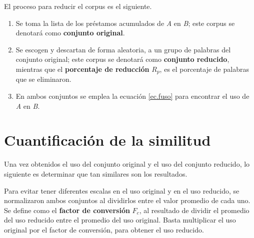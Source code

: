 El proceso para reducir el corpus es el siguiente. 

\begin{enumerate}
	
	\item Se toma la lista de los préstamos acumulados de \textit{A} en \textit{B}; este corpus se denotará como \textbf{conjunto original}.
	
	\item Se escogen y descartan de forma aleatoria, a un grupo de palabras del conjunto original; este corpus  se denotará como \textbf{conjunto reducido}, mientras que el \textbf{porcentaje de reducción} $R_{p}$, es el porcentaje de palabras que se eliminaron.
	
	
	
	\item En ambos conjuntos se emplea la ecuación \ref{ec.fuso} para encontrar el uso de \textit{A} en \textit{B}. %
	
\end{enumerate}

\section{Cuantificación de la similitud}

Una vez obtenidos el uso del conjunto original y el uso del conjunto reducido, lo siguiente es determinar que tan similares son los resultados.

Para evitar tener diferentes escalas en el uso original y en el uso reducido, se normalizaron ambos conjuntos al dividirlos entre el valor promedio de cada uno.  Se define como el \textbf{factor de conversión} $F_{c}$,  al resultado de dividir el promedio del uso reducido  entre el promedio del uso original.  Basta multiplicar el uso original por el factor de conversión, para obtener el uso reducido.


